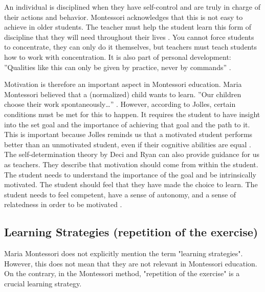 \documentclass[12pt, a4paper]{article}
\begin{document}
An individual is disciplined when they have self-control and are truly in charge of their actions and behavior.
Montessori acknowledges that this is not easy to achieve in older students. The teacher must help the student learn this form of discipline that they will need throughout their lives \cite{Montessori2017}.
You cannot force students to concentrate, they can only do it themselves, but teachers must teach students how to work with concentration. It is also part of personal development: ''Qualities like this can only be given by practice, never by commands'' \cite[pp. 187-188]{Montessori2016}.

Motivation is therefore an important aspect in Montessori education. Maria Montessori believed that a (normalized) child wants to learn. ''Our children choose their work spontaneously\dots'' \cite[p.47]{Gimbel}. However, according to Jolles, certain conditions must be met for this to happen. It requires the student to have insight into the set goal and the importance of achieving that goal and the path to it. This is important because Jolles reminds us that a motivated student performs better than an unmotivated student, even if their cognitive abilities are equal \cite[p.151]{jolles}.
The self-determination theory by Deci and Ryan can also provide guidance for us as teachers. They describe that motivation should come from within the student. The student needs to understand the importance of the goal and be intrinsically motivated. The student should feel that they have made the choice to learn. The student needs to feel competent, have a sense of autonomy, and a sense of relatedness in order to be motivated \cite[p.436-439]{woolfolk}.

\subsection{Learning Strategies (repetition of the exercise)}
Maria Montessori does not explicitly mention the term "learning strategies". However, this does not mean that they are not relevant in Montessori education. On the contrary, in the Montessori method, "repetition of the exercise" is a crucial learning strategy.
\end{document}
